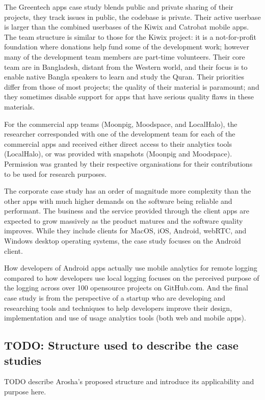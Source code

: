 The Greentech apps case study blends public and private sharing of their projects, they track issues in public, the codebase is private. Their active userbase is larger than the combined userbases of the Kiwix and Catrobat mobile apps. The team structure is similar to those for the Kiwix project: it is a not-for-profit foundation where donations help fund some of the development work; however many of the development team members are part-time volunteers. Their core team are in Bangladesh, distant from the Western world, and their focus is to enable native Bangla speakers to learn and study the Quran. Their priorities differ from those of most projects; the quality of their material is paramount; and they sometimes disable support for apps that have serious quality flaws in these materials. 

For the commercial app teams (Moonpig, Moodspace, and LocalHalo), the researcher corresponded with one of the development team for each of the commercial apps and received either direct access to their analytics tools (LocalHalo), or was provided with snapshots (Moonpig and Moodspace). Permission was granted by their respective organisations for their contributions to be used for research purposes.

The corporate case study has an order of magnitude more complexity than the other apps with much higher demands on the software being reliable and performant. The business and the service provided through the client apps are expected to grow massively as the product matures and the software quality improves. While they include clients for MacOS, iOS, Android, webRTC, and Windows desktop operating systems, the case study focuses on the Android client.

How developers of Android apps actually use mobile analytics for remote logging compared to how developers use local logging focuses on the perceived purpose of the logging across over 100 opensource projects on GitHub.com. And the final case study is from the perspective of a startup who are developing and researching tools and techniques to help developers improve their design, implementation and use of usage analytics tools (both web and mobile apps). 

\subsection{TODO: Structure used to describe the case studies}
TODO describe Arosha's proposed structure and introduce its applicability and purpose here.


